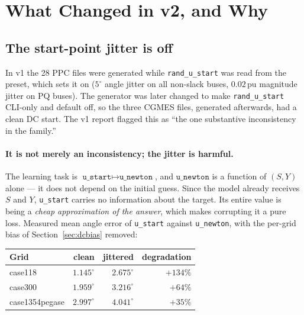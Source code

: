 \documentclass{article}
\newcommand{\dbad}[1]{\textcolor{bad}{#1}}
\newcommand{\pu}{\,\text{pu}}
\begin{document}
\section{What Changed in v2, and Why}

\subsection{The start-point jitter is off}
\label{sec:u0}

In v1 the 28 PPC files were generated while \texttt{rand\_u\_start} was read
from the preset, which sets it on ($5^\circ$ angle jitter on all non-slack
buses, $0.02\pu$ magnitude jitter on PQ buses).  The generator was later
changed to make \texttt{rand\_u\_start} CLI-only and default off, so the three
CGMES files, generated afterwards, had a clean DC start.  The v1 report flagged
this as ``the one substantive inconsistency in the family.''

\paragraph{It is not merely an inconsistency; the jitter is harmful.}
The learning task is $\texttt{u\_start} \mapsto \texttt{u\_newton}$, and
$\texttt{u\_newton}$ is a function of $(S, Y)$ alone --- it does not depend on
the initial guess.  Since the model already receives $S$ and $Y$,
\texttt{u\_start} carries no information about the target.  Its entire value is
being a \emph{cheap approximation of the answer}, which makes corrupting it a
pure loss.  Measured mean angle error of \texttt{u\_start} against
\texttt{u\_newton}, with the per-grid bias of Section~\ref{sec:dcbias} removed:

\begin{center}
\begin{tabular}{lrrr}
\toprule
\textbf{Grid} & \textbf{clean} & \textbf{jittered} & \textbf{degradation} \\
\midrule
case118        & $1.145^\circ$ & $2.675^\circ$ & \dbad{$+134\%$} \\
case300        & $1.959^\circ$ & $3.216^\circ$ & \dbad{$+64\%$} \\
case1354pegase & $2.997^\circ$ & $4.041^\circ$ & \dbad{$+35\%$} \\
\bottomrule
\end{tabular}
\end{center}
\end{document}
